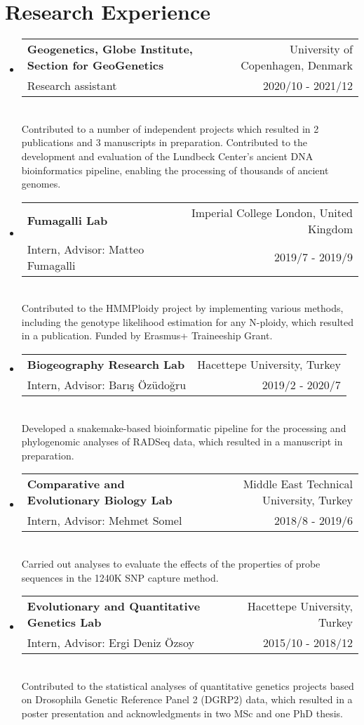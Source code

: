 \documentclass[letterpaper,10.5pt]{article}
\makeatletter
\newcommand{\resumeSubheading}[5]{
  \vspace{-1pt}\item
    \begin{tabular*}{0.97\textwidth}{l@{\extracolsep{\fill}}r}
      \textbf{#1} & #2 \\
      {\small#3} & {\small #4} \\
    \end{tabular*}\vspace{3pt} \\
    #5
}
\newcommand{\resumeSubHeadingListStart}{\begin{itemize}[leftmargin=*]}
\newcommand{\resumeSubHeadingListEnd}{\end{itemize}}
\makeatother
\begin{document}
\section{Research Experience}
  \resumeSubHeadingListStart

    \resumeSubheading
      {Geogenetics, Globe Institute, Section for GeoGenetics}{University of Copenhagen, Denmark}
      {Research assistant}{2020/10 - 2021/12}
      {Contributed to a number of independent projects which resulted in 2 publications and 3 manuscripts in preparation. Contributed to the development and evaluation of the Lundbeck Center's ancient DNA bioinformatics pipeline, enabling the processing of thousands of ancient genomes. }
    \medskip
    
    
    \resumeSubheading
      {Fumagalli Lab}{Imperial College London, United Kingdom}
      {Intern, Advisor: Matteo Fumagalli}{2019/7 - 2019/9}
      {Contributed to the HMMPloidy project by implementing various methods, including the genotype likelihood estimation for any N-ploidy, which resulted in a publication. Funded by Erasmus+ Traineeship Grant.}
    \medskip


    \resumeSubheading
      {Biogeography Research Lab}{Hacettepe University, Turkey}
      {Intern, Advisor: Bar{\i}\c{s} \"{O}z\"{u}do\u{g}ru}{2019/2 - 2020/7}
      {Developed a snakemake-based bioinformatic pipeline for the processing and phylogenomic analyses of RADSeq data, which resulted in a manuscript in preparation.}
    \medskip
 
    \resumeSubheading
      {Comparative and Evolutionary Biology Lab}{Middle East Technical University, Turkey}
      {Intern, Advisor: Mehmet Somel}{2018/8 - 2019/6}
      {Carried out analyses to evaluate the effects of the properties of probe sequences in the 1240K SNP capture method.}

    \medskip


    \resumeSubheading
      {Evolutionary and Quantitative Genetics Lab}{Hacettepe University, Turkey}
      {Intern, Advisor: Ergi Deniz \"{O}zsoy}{2015/10 - 2018/12}
      {Contributed to the statistical analyses of quantitative genetics projects based on Drosophila Genetic Reference Panel 2 (DGRP2) data, which resulted in a poster presentation and acknowledgments in two MSc and one PhD thesis.}
  \resumeSubHeadingListEnd
  
\end{document}
